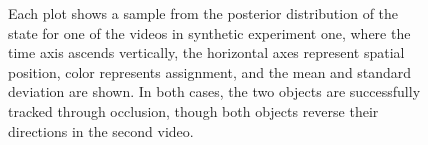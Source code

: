 \documentclass[smallcondensed, final]{svjour3}
\begin{document}
\begin{figure}
  \centering               
  \caption{Each plot shows a sample from the posterior distribution of the state for one of the videos in synthetic experiment one, where the time axis ascends vertically, the horizontal axes represent spatial position, color represents assignment, and the mean and standard deviation are shown. In both cases, the two objects are successfully tracked through occlusion, though both objects reverse their directions in the second video.}
  \label{fig:synth_one_plot}
\end{figure}
\end{document}
